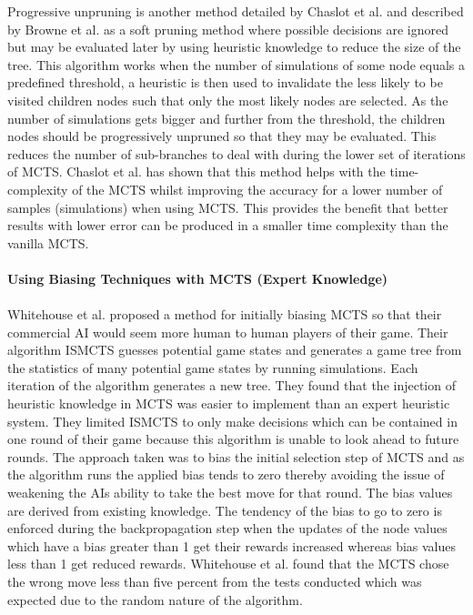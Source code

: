 \documentclass [11pt]{article}
\begin{document}
	\noindent Progressive unpruning is another method detailed by Chaslot et al. \cite{progressive} and described by Browne et al. \cite{survey} as a soft pruning method where possible decisions are ignored but may be evaluated later by using heuristic knowledge to reduce the size of the tree. This algorithm works when the number of simulations of some node equals a predefined threshold, a heuristic is then used to invalidate the less likely to be visited children nodes such that only the most likely nodes are selected. As the number of simulations gets bigger and further from the threshold, the children nodes should be progressively unpruned so that they may be evaluated. This reduces the number of sub-branches to deal with during the lower set of iterations of MCTS. Chaslot et al. \cite{progressive} has shown that this method helps with the time-complexity of the MCTS whilst improving the accuracy for a lower number of samples (simulations) when using MCTS. This provides the benefit that better results with lower error can be produced in a smaller time complexity than the vanilla MCTS.\\\\
	
	\noindent \textbf{Using Biasing Techniques with MCTS (Expert Knowledge)}\\\\
	Whitehouse et al. \cite{knowledge} proposed a method for initially biasing MCTS so that their commercial AI would seem more human to human players of their game. Their algorithm ISMCTS guesses potential game states and generates a game tree from the statistics of many potential game states by running simulations. Each iteration of the algorithm generates a new tree. They found that the injection of heuristic knowledge in MCTS was easier to implement than an expert heuristic system. They limited ISMCTS to only make decisions which can be contained in one round of their game because this algorithm is unable to look ahead to future rounds. The approach taken was to bias the initial selection step of MCTS and as the algorithm runs the applied bias tends to zero thereby avoiding the issue of weakening the AIs ability to take the best move for that round. The bias values are derived from existing knowledge. The tendency of the bias to go to zero is enforced during the backpropagation step when the updates of the node values which have a bias greater than 1 get their rewards increased whereas bias values less than 1 get reduced rewards. Whitehouse et al. \cite{knowledge} found that the MCTS chose the wrong move less than five percent from the tests conducted which was expected due to the random nature of the algorithm.\\
	
\end{document}
